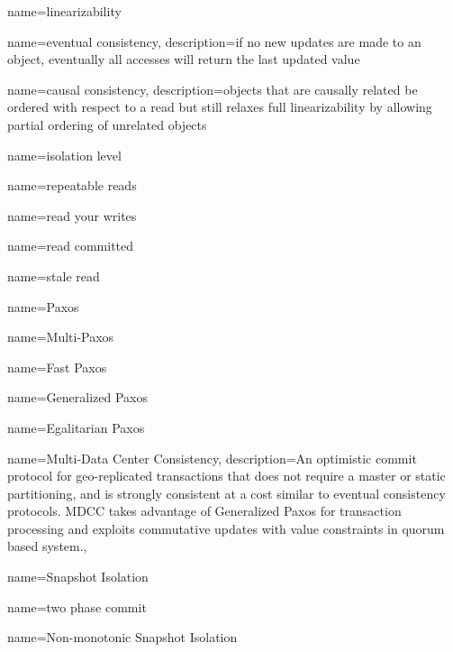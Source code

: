 %
%
%
%

{
    name=linearizability
}

{
    name={eventual consistency},
    description={if no new updates are made to an object, eventually all accesses will return the last updated value}
}

{
    name={causal consistency},
    description={objects that are causally related be ordered with respect to a read but still relaxes full linearizability by allowing partial ordering of unrelated objects}
}

{
    name={isolation level}
}

{
    name={repeatable reads}
}

{
    name={read your writes}
}

{
    name={read committed}
}

{
    name={stale read}
}

{
    name={Paxos}
}

{
    name={Multi-Paxos}
}

{
    name={Fast Paxos}
}

{
    name={Generalized Paxos}
}

{
    name={Egalitarian Paxos}
}

 {
  name={Multi-Data Center Consistency},
  description={An optimistic commit protocol for geo-replicated transactions that does not require a master or static partitioning, and is strongly consistent at a cost similar to eventual consistency protocols. MDCC takes advantage of Generalized Paxos for transaction processing and exploits commutative updates with value constraints in quorum based system.},
}

 {
    name={Snapshot Isolation}
}

\newglossaryentry{2pc} {
    name={two phase commit}
}

 {
    name={Non-monotonic Snapshot Isolation}
}


